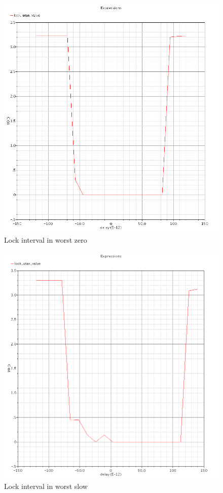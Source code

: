 \documentclass[a4paper,12pt]{article} \usepackage{graphicx}
\begin{document}
\begin{figure}[h]
  \centering
  \includegraphics[width=5in]{../Bilder/LD_tran/LD_lsim_wz.png}
  \caption{Lock interval in worst zero}
  \label{fig:LDwz}
\end{figure}

\begin{figure}[h]
  \centering
  \includegraphics[width=5in]{../Bilder/LD_tran/LD_lsim_ws.png}
  \caption{Lock interval in worst slow}
  \label{fig:LDws}
\end{figure}
\end{document}
